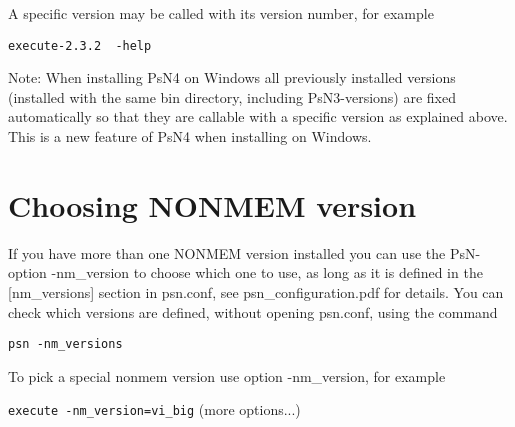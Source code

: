 \noindent A specific version may be called with its version number, for example

\begin{verbatim}
execute-2.3.2  -help 
\end{verbatim}

\noindent Note: When installing PsN4 on Windows all previously installed versions (installed with the same bin directory,
including PsN3-versions) are fixed automatically so that they are callable with a specific version as 
explained above. This is a new feature of PsN4 when installing on Windows.

\section{Choosing NONMEM version}
If you have more than one NONMEM version installed you can use the PsN-option 
-nm\_version to choose which one to use, as long as it is 
defined in the [nm\_versions] section in psn.conf, see psn\_configuration.pdf for details. 
You can check which versions are defined, without opening psn.conf, using the command

\begin{verbatim}
psn -nm_versions
\end{verbatim}

\noindent To pick a special nonmem version use option -nm\_version, for example

\verb|execute -nm_version=vi_big| (more options...)

